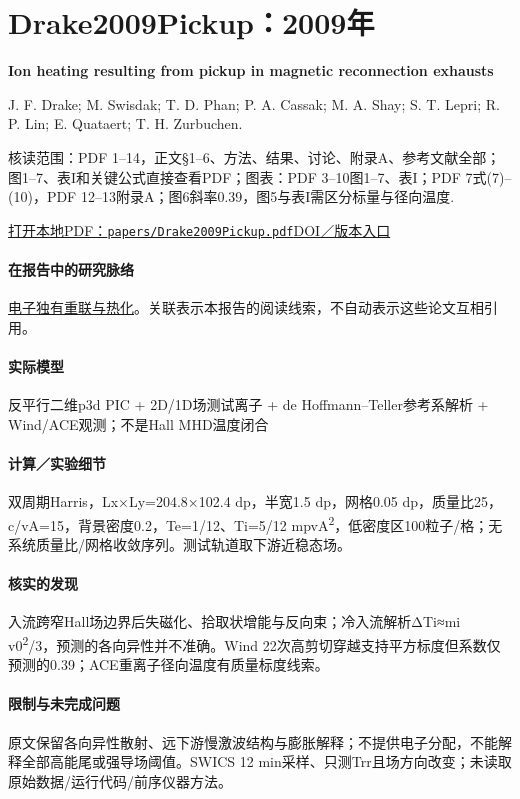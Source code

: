 \section{Drake2009Pickup：2009年}\label{paper:Drake2009Pickup}

\textbf{Ion heating resulting from pickup in magnetic reconnection exhausts}\citep{Drake2009Pickup}\

J. F. Drake;  M. Swisdak;  T. D. Phan;  P. A. Cassak;  M. A. Shay;  S. T. Lepri;  R. P. Lin;  E. Quataert;  T. H. Zurbuchen.

\textsf{核读范围：}PDF 1–14，正文§1–6、方法、结果、讨论、附录A、参考文献全部；图1–7、表I和关键公式直接查看PDF；\textsf{图表：}PDF 3–10图1–7、表I；PDF 7式(7)–(10)，PDF 12–13附录A；图6斜率0.39，图5与表I需区分标量与径向温度.

\href{run:papers/Drake2009Pickup.pdf}{打开本地PDF：\texttt{papers/Drake2009Pickup.pdf}}\quad\href{https://doi.org/10.1029/2008JA013701}{DOI／版本入口}

\paragraph{在报告中的研究脉络}\hyperref[story:energy]{电子独有重联与热化}。关联表示本报告的阅读线索，不自动表示这些论文互相引用。

\paragraph{实际模型}反平行二维p3d PIC + 2D/1D场测试离子 + de Hoffmann–Teller参考系解析 + Wind/ACE观测；不是Hall MHD温度闭合

\paragraph{计算／实验细节}双周期Harris，Lx×Ly=204.8×102.4 dp，半宽1.5 dp，网格0.05 dp，质量比25，c/vA=15，背景密度0.2，Te=1/12、Ti=5/12 mpvA\textsuperscript{2}，低密度区100粒子/格；无系统质量比/网格收敛序列。测试轨道取下游近稳态场。

\paragraph{核实的发现}入流跨窄Hall场边界后失磁化、拾取状增能与反向束；冷入流解析ΔTi≈mi v0\textsuperscript{2}/3，预测的各向异性并不准确。Wind 22次高剪切穿越支持平方标度但系数仅预测的0.39；ACE重离子径向温度有质量标度线索。

\paragraph{限制与未完成问题}原文保留各向异性散射、远下游慢激波结构与膨胀解释；不提供电子分配，不能解释全部高能尾或强导场阈值。SWICS 12 min采样、只测Trr且场方向改变；未读取原始数据/运行代码/前序仪器方法。

